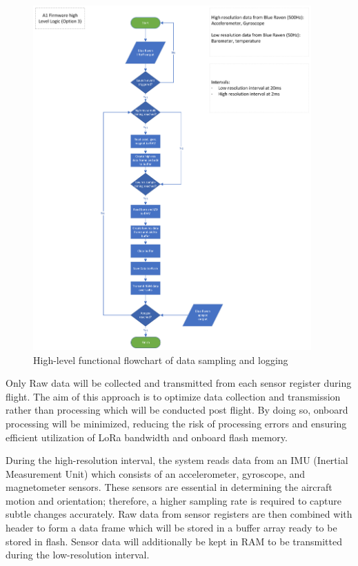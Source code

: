 \begin{figure}[h]
  \begin{center}
    \includegraphics[width=0.95\textwidth]{img/flowchart-high_level.png}
  \end{center}
  \caption{High-level functional flowchart of data sampling and logging}\label{fig:flowchart-high_level}
\end{figure}

Only Raw data will be collected and transmitted from each sensor register during flight. The aim of this approach is to optimize data collection and transmission rather than processing which will be conducted post flight. By doing so, onboard processing will be minimized, reducing the risk of processing errors and ensuring efficient utilization of LoRa bandwidth and onboard flash memory. 

During the high-resolution interval, the system reads data from an IMU (Inertial Measurement Unit) which consists of an accelerometer, gyroscope, and magnetometer sensors. These sensors are essential in determining the aircraft motion and orientation; therefore, a higher sampling rate is required to capture subtle changes accurately. Raw data from sensor registers are then combined with header to form a data frame which will be stored in a buffer array ready to be stored in flash. Sensor data will additionally be kept in RAM to be transmitted during the low-resolution interval.  

